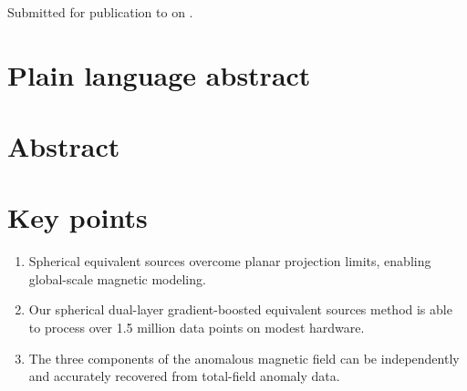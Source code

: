 \documentclass[onecolumn,10pt,a4paper]{article}
\begin{document}
\begin{FlushLeft}
    {\Large\bfseries \Title}
    \\[0.3cm]
    \Authors
    \\[0.3cm]
    {\Affiliations}
    \\[0.3cm]
    {Submitted for publication to \textit{\Journal{}} on \SubmittedOn.}
\end{FlushLeft}

\linenumbers

\section*{Plain language abstract}



\section*{Abstract}



\section*{Key points}

\begin{enumerate}
  \item Spherical equivalent sources overcome planar projection limits,
  enabling global-scale magnetic modeling.
  \item Our spherical dual-layer gradient-boosted equivalent sources method is
    able to process over 1.5 million data points on modest hardware.
  \item The three components of the anomalous magnetic field can be
    independently and accurately recovered from total-field anomaly data.
\end{enumerate}





\end{document}

